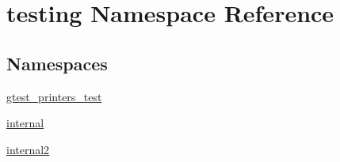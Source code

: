 \hypertarget{namespacetesting}{}\section{testing Namespace Reference}
\label{namespacetesting}
\subsection*{Namespaces}
\begin{DoxyCompactItemize}
\item 
 \hyperlink{namespacetesting_1_1gtest__printers__test}{gtest\+\_\+printers\+\_\+test}
\item 
 \hyperlink{namespacetesting_1_1internal}{internal}
\item 
 \hyperlink{namespacetesting_1_1internal2}{internal2}
\end{DoxyCompactItemize}
